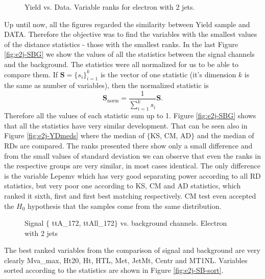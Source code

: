 \begin{figure}[h!]
    \quad
    \caption{Yield vs. Data. Variable ranks for electron with 2 jets.}
    \label{fig:e2j-RD}
\end{figure}

Up until now, all the figures regarded the similarity between Yield sample and DATA. Therefore the objective was to find the variables with the smallest values of the distance statistics - those with the smallest ranks. In the last Figure \ref{fig:e2j-SBG} we show the values of all the statistics between the signal channels and the background. The statistics were all normalized for us to be able to compare them. If $\mathbf{S} = \lbrace s_i\rbrace_{i=1}^k$ is the vector of one statistic (it's dimension $k$ is the same as number of variables), then the normalized statistic is 
\begin{equation*}
\mathbf{S}_\mathrm{norm} = \dfrac{1}{\sum_{i=1}^k s_i} \mathbf{S}.
\end{equation*}
Therefore all the values of each statistic sum up to 1. Figure \ref{fig:e2j-SBG} shows that all the statistics have very similar development. That can be seen also in Figure \ref{fig:e2j-YDmeds} where the median of $\lbrace$KS, CM, AD$\rbrace$ and the median of RDs are compared. The ranks presented there show only a small difference and from the small values of standard deviation we can observe that even the ranks in the respective groups are very similar, in most cases identical. The only difference is the variable \textsf{Lepemv} which has very good separating power according to all RD statistics, but very poor one according to KS, CM and AD statistics, which ranked it sixth, first and first best matching respectively. CM test even accepted the $H_0$ hypothesis that the samples come from the same distribution.  
\begin{figure}[h]
\quad
    \caption{Signal $\lbrace$ \textsf{ttA\_172},  \textsf{ttAll\_172}$\rbrace$ vs. background channels. Electron with 2 jets}
    \label{fig:e2j-SBGmed}
\end{figure}
The best ranked variables from the comparison of signal and background are very clearly \textsf{Mva\_max, Ht20, Ht, HTL, Met, JetMt, Centr  } and \textsf{MT1NL}. Variables sorted according to the statistics are shown in Figure \ref{fig:e2j-SB-sort}.

